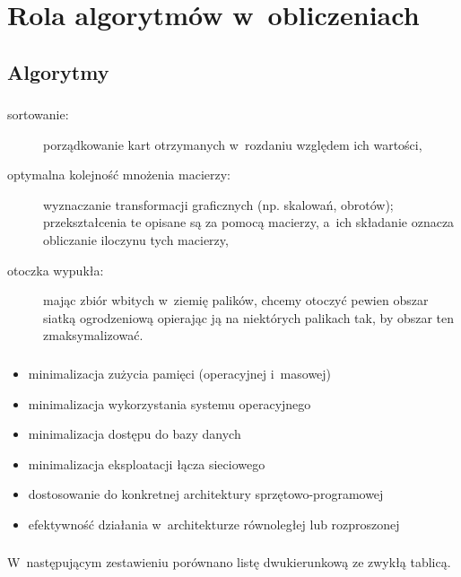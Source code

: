 \chapter{Rola algorytmów w~obliczeniach}

\section{Algorytmy}

\subsection{} %
\begin{description}
	\item[sortowanie:] porządkowanie kart otrzymanych w~rozdaniu względem ich wartości,
	\item[optymalna kolejność mnożenia macierzy:] wyznaczanie transformacji graficznych (np. skalowań, obrotów); przekształcenia te opisane są za pomocą macierzy, a~ich składanie oznacza obliczanie iloczynu tych macierzy,
	\item[otoczka wypukła:] mając zbiór wbitych w~ziemię palików, chcemy otoczyć pewien obszar siatką ogrodzeniową opierając ją na niektórych palikach tak, by obszar ten zmaksymalizować.
\end{description}

\subsection{} %
\begin{itemize}
	\item minimalizacja zużycia pamięci (operacyjnej i~masowej)
	\item minimalizacja wykorzystania systemu operacyjnego
	\item minimalizacja dostępu do bazy danych
	\item minimalizacja eksploatacji łącza sieciowego
	\item dostosowanie do konkretnej architektury sprzętowo-programowej
	\item efektywność działania w~architekturze równoległej lub rozproszonej
\end{itemize}

\subsection{} %
W~następującym zestawieniu porównano listę dwukierunkową ze zwykłą tablicą.

